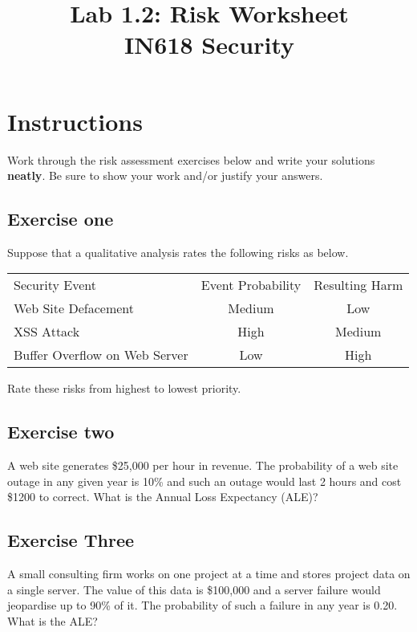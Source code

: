 \documentclass{article}
\begin{document}
\title{Lab 1.2: Risk Worksheet\\ IN618 Security}
\date{}
\maketitle

\section*{Instructions}
Work through the risk assessment exercises below and write your solutions \textbf{neatly}.  Be sure to show your work and/or justify your answers.

\subsection*{Exercise one}
Suppose that a qualitative analysis rates the following risks as below.

\vspace{5mm}

\begin{tabular}{l c c}
	Security Event & Event Probability & Resulting Harm \\
	Web Site Defacement & Medium & Low \\
	XSS Attack & High & Medium \\
	Buffer Overflow on Web Server & Low & High \\

\end{tabular}

Rate these risks from highest to lowest priority.

\vspace{25mm}

\subsection*{Exercise two}
A web site generates \$25,000 per hour in revenue. The probability of a web site outage in any given year is 10\% and such an outage would last 2 hours and cost \$1200 to correct. What is the Annual Loss Expectancy (ALE)?

\newpage

\subsection*{Exercise Three}
A small consulting firm works on one project at a time and stores project data on a single server. The value of this data is \$100,000 and a server failure would jeopardise up to 90\% of it. The probability of such a failure in any year is 0.20.  What is the ALE?
\end{document}

